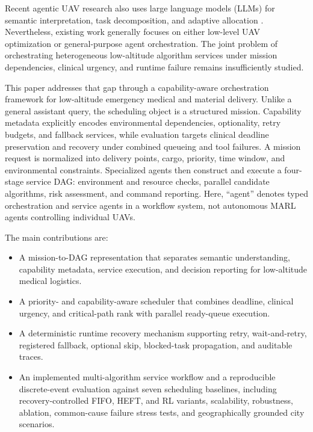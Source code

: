 \documentclass[conference]{IEEEtran}
\begin{document}
Recent agentic UAV research also uses large language models (LLMs) for
semantic interpretation, task decomposition, and adaptive allocation
\cite{tian2025uavs,zhang2025coordfield}. Nevertheless, existing work generally
focuses on either low-level UAV optimization or general-purpose agent
orchestration. The joint problem of orchestrating heterogeneous low-altitude
algorithm services under mission dependencies, clinical urgency, and runtime
failure remains insufficiently studied.

This paper addresses that gap through a capability-aware orchestration
framework for low-altitude emergency medical and material delivery. Unlike a
general assistant query, the scheduling object is a structured mission.
Capability metadata explicitly encodes environmental dependencies,
optionality, retry budgets, and fallback services, while evaluation targets
clinical deadline preservation and recovery under combined queueing and tool
failures. A mission request is normalized into delivery points, cargo,
priority, time window, and environmental constraints. Specialized agents then
construct and execute a four-stage service DAG: environment and resource
checks, parallel candidate algorithms, risk assessment, and command
reporting.
Here, ``agent'' denotes typed orchestration and service agents in a workflow
system, not autonomous MARL agents controlling individual UAVs.

The main contributions are:
\begin{itemize}
    \item A mission-to-DAG representation that separates semantic
    understanding, capability metadata, service execution, and decision
    reporting for low-altitude medical logistics.
    \item A priority- and capability-aware scheduler that combines deadline,
    clinical urgency, and critical-path rank with parallel ready-queue
    execution.
    \item A deterministic runtime recovery mechanism supporting retry,
    wait-and-retry, registered fallback, optional skip, blocked-task
    propagation, and auditable traces.
    \item An implemented multi-algorithm service workflow and a reproducible
    discrete-event evaluation against seven scheduling baselines, including
    recovery-controlled FIFO, HEFT, and RL variants, scalability, robustness,
    ablation, common-cause failure stress tests, and geographically grounded
    city scenarios.
\end{itemize}
\end{document}
